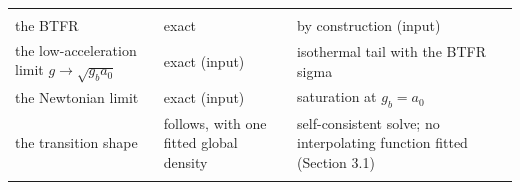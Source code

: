\documentclass[
  10pt,
]{article}
\begin{document}
\begin{longtable}[]{@{}lll@{}}
\begin{minipage}[t]{0.24\columnwidth}
\end{minipage} & \begin{minipage}[t]{0.20\columnwidth}\raggedright
\strut
\end{minipage} & \begin{minipage}[t]{0.50\columnwidth}\raggedright
\strut
\end{minipage}\tabularnewline
\begin{minipage}[t]{0.24\columnwidth}\raggedright
the BTFR\strut
\end{minipage} & \begin{minipage}[t]{0.20\columnwidth}\raggedright
exact\strut
\end{minipage} & \begin{minipage}[t]{0.50\columnwidth}\raggedright
by construction (input)\strut
\end{minipage}\tabularnewline
\begin{minipage}[t]{0.24\columnwidth}\raggedright
the low-acceleration limit $g\to\sqrt{g_b a_0}$\strut
\end{minipage} & \begin{minipage}[t]{0.20\columnwidth}\raggedright
exact (input)\strut
\end{minipage} & \begin{minipage}[t]{0.50\columnwidth}\raggedright
isothermal tail with the BTFR sigma\strut
\end{minipage}\tabularnewline
\begin{minipage}[t]{0.24\columnwidth}\raggedright
the Newtonian limit\strut
\end{minipage} & \begin{minipage}[t]{0.20\columnwidth}\raggedright
exact (input)\strut
\end{minipage} & \begin{minipage}[t]{0.50\columnwidth}\raggedright
saturation at $g_b=a_0$\strut
\end{minipage}\tabularnewline
\begin{minipage}[t]{0.24\columnwidth}\raggedright
the transition shape\strut
\end{minipage} & \begin{minipage}[t]{0.20\columnwidth}\raggedright
follows, with one fitted global density\strut
\end{minipage} & \begin{minipage}[t]{0.50\columnwidth}\raggedright
self-consistent solve; no interpolating function fitted (Section 3.1)\strut
\end{minipage}\tabularnewline
\begin{minipage}[t]{0.24\columnwidth}\raggedright

\end{minipage}
\end{longtable}
\end{document}
